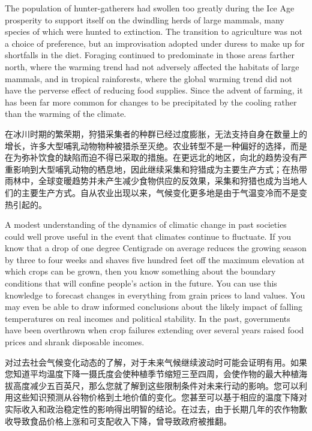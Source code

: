 \begin{Parallel}{97mm}{45mm}
  \ParallelLText
  {The population of hunter-gatherers had swollen too greatly during the Ice Age prosperity to support itself on the dwindling herds of large mammals, many species of which were hunted to extinction. The transition to agriculture was not a choice of preference, but an improvisation adopted under duress to make up for shortfalls in the diet. Foraging continued to predominate in those areas farther north, where the warming trend had not adversely affected the habitats of large mammals, and in tropical rainforests, where the global warming trend did not have the perverse effect of reducing food supplies. Since the advent of farming, it has been far more common for changes to be precipitated by the cooling rather than the warming of the climate.}
  
  \ParallelRText
  {在冰川时期的繁荣期，狩猎采集者的种群已经过度膨胀，无法支持自身在数量上的增长，许多大型哺乳动物物种被猎杀至灭绝。农业转型不是一种偏好的选择，而是在为弥补饮食的缺陷而迫不得已采取的措施。在更远北的地区，向北的趋势没有严重影响到大型哺乳动物的栖息地，因此继续采集和狩猎成为主要生产方式；在热带雨林中，全球变暖趋势并未产生减少食物供应的反效果，采集和狩猎也成为当地人们的主要生产方式。自从农业出现以来，气候变化更多地是由于气温变冷而不是变热引起的。}
  \ParallelPar


  \ParallelLText
  {A modest understanding of the dynamics of climatic change in past societies could well prove useful in the event that climates continue to fluctuate. If you know that a drop of one degree Centigrade on average reduces the growing season by three to four weeks and shaves five hundred feet off the maximum elevation at which crops can be grown, then you know something about the boundary conditions that will confine people's action in the future. You can use this knowledge to forecast changes in everything from grain prices to land values. You may even be able to draw informed conclusions about the likely impact of falling temperatures on real incomes and political stability. In the past, governments have been overthrown when crop failures extending over several years raised food prices and shrank disposable incomes.}
  
  \ParallelRText
  {对过去社会气候变化动态的了解，对于未来气候继续波动时可能会证明有用。如果您知道平均温度下降一摄氏度会使种植季节缩短三至四周，会使作物的最大种植海拔高度减少五百英尺，那么您就了解到这些限制条件对未来行动的影响。您可以利用这些知识预测从谷物价格到土地价值的变化。您甚至可以基于相应的温度下降对实际收入和政治稳定性的影响得出明智的结论。在过去，由于长期几年的农作物歉收导致食品价格上涨和可支配收入下降，曾导致政府被推翻。}
  \ParallelPar



\end{Parallel}
